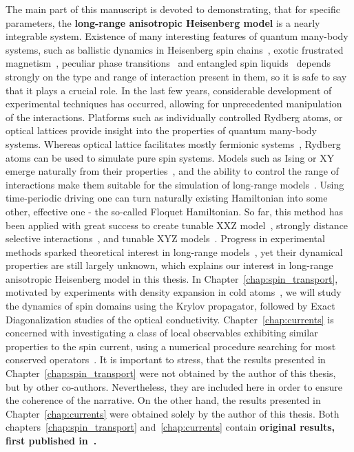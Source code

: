 The main part of this manuscript is devoted to demonstrating, that for specific parameters, the
 \textbf{long-range anisotropic Heisenberg model} is a nearly integrable system.
Existence of many interesting features of quantum many-body systems, such as ballistic dynamics in Heisenberg spin
chains~\autocite{Zotos1997,Bertini2021},
exotic frustrated magnetism~\autocite{Nisoli2017}, peculiar phase transitions~\autocite{Sandvik2010a,Yang2021}
and entangled spin liquids~\autocite{Balents2010} depends strongly
on the type and range of interaction present in them, so it is safe to say that it plays a crucial role.
In the last few years, considerable development of experimental techniques has
occurred, allowing for unprecedented manipulation of the interactions.
Platforms such as individually controlled Rydberg atoms, or optical lattices provide insight into the
properties of quantum many-body systems. Whereas optical lattice facilitates mostly fermionic
systems~\autocite{Bakr2009, Greif2016, Parsons2015, Boll2016}, Rydberg atoms can be used to simulate pure spin systems.
Models such as Ising or XY emerge naturally from their properties~\autocite{Browaeys2020}, and the ability to control
the range of interactions make them suitable for the simulation of long-range models~\autocite{Borish2020}. Using time-periodic
driving one can turn naturally existing Hamiltonian into some other, effective one - the so-called Floquet Hamiltonian.
So far, this method has been applied with great success to create tunable XXZ model~\autocite{Scholl2022}, strongly distance
selective interactions~\autocite{Hollerith2022}, and tunable XYZ models~\autocite{Steinert2022, Geier2021}.
Progress in experimental methods sparked theoretical interest in long-range
models~\autocite{Richerme2014,Jurcevic2014,Hauke2013,Foss-Feig2015,Maghrebi2016,Lepori2017,Frerot2017,Vanderstraeten2018,Cevolani2018,Kloss2019,Ren2020,Bulchandani2022a},
yet their dynamical properties are still largely unknown, which explains our interest in long-range anisotropic
Heisenberg model in this thesis.
In Chapter~\ref{chap:spin_transport}, motivated by experiments with density expansion in cold atoms~\autocite{Ronzheimer2013,Vidmar2013,Neyenhuis2017},
we will study the dynamics of spin domains using the Krylov propagator, followed by Exact Diagonalization studies of the optical conductivity.
Chapter~\ref{chap:currents} is concerned with investigating a class of local observables exhibiting similar properties
to the spin current, using a numerical procedure searching for most conserved operators~\autocite{Mierzejewski2015a}.
It is important to stress, that the results presented in Chapter~\ref{chap:spin_transport} were not obtained
by the author of this thesis, but by other co-authors. Nevertheless, they are included here in order to ensure
the coherence of the narrative. On the other hand, the results presented in Chapter~\ref{chap:currents} were
obtained solely by the author of this thesis. Both chapters~\ref{chap:spin_transport} and~\ref{chap:currents}
contain \textbf{original results, first published in~\textcite{Mierzejewski2023}.} 

